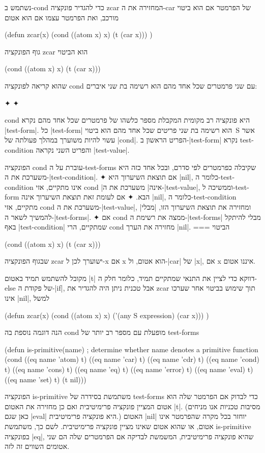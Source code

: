 נשתמש ב-cond כדי להגדיר פונקציה zcar המחזירה את ה-car של הפרמטר אם
הוא ביטוי מורכב, ואת הפרמטר עצמו אם הוא אטום
\begin{LISP}
(defun zcar(x)
  (cond ((atom x) x) (t (car x)))
)
\end{LISP}
גוף הפונקציה zcar הוא הביטוי
\begin{LISP}
  (cond ((atom x) x) (t (car x)))
\end{LISP}
שהוא קריאה לפונקציה cond עם שני פרמטרים שכל אחד מהם הוא רשימה בת שני איברים:
\begin{LTR}
  \begin{itemize}
    ✦ 
    ✦ 
  \end{itemize}
\end{LTR}
cond היא פונקציה רב מקומית המקבלת מספר כלשהו של פרמטרים שכל אחד מהם נקרא
\E|test-form|. כל \E|test-form| הוא רשימה בת שני פריטים שכל אחד מהם הוא ביטוי~S
אשר עשוי להיות משוערך במהלך פעולתה של \E|cond|. הפריט הראשון ב-\E|test-form|
נקרא test-condition והפריט השני נקראה \E|test-value|.

הפונקציה cond עוברת על ה-test-forms שקיבלה כפרמטרים לפי סדרם, ובכל אחד כזה היא
משערכת את ה-\E|test-condition|.
✦ אם תוצאת השיערוך היא \E|nil|, כלומר ה-test-condition אינו מתקיים, אזי cond
\ע|אינה| משערכת את ה-\E|test-value|, וממשיכה ל-test-form הבא.
✦ אם לעומת זאת תוצאת השיערוך אינה \E|nil|, כלומר ה-test-condition מתקיים, אזי
cond משערכת את ה-\E|test-value|, ומחזירה את תוצאת השיערוך הזו, \ע|מבלי|
להמשיך לשאר ה-\E|test-forms|.
✦ אם cond ממצה את רשימת ה-\E|test-forms| מבלי להיתקל באף \E|test-condition|
שמתקיים, הרי cond מחזירה את הערך \E|nil|.
===
הביטוי
\begin{LISP}
  (cond ((atom x) x) (t (car x)))
\end{LISP}
שבגוף הפונקציה zcar ישוערך לכן ל-x אם x הוא אטום, ול-\E|car| של \E|x|, אם x
איננו אטום.

מקובל להשתמש תמיד באטום \E|t| דווקא כדי לציין את התנאי שמתקיים תמיד, כלומר חלק
ה-else של פקודת ה-\E|if|, אבל טכנית ניתן היה להגדיר את zcar תוך שימוש בביטוי
אחר שערכו אינו \E|nil|, למשל
\begin{LISP}
(defun zcar(x)
  (cond ((atom x) x) ('(any S expression) (car x)))
)
\end{LISP}
הנה דוגמה נוספת בה cond מופעלת עם מספר רב יותר של test-forms
\begin{LISP}
(defun is-primitive(name) ; determine whether name denotes a primitive function
  (cond ((eq name 'atom) t)
        ((eq name 'car) t)
        ((eq name 'cdr) t)
        ((eq name 'cond) t)
        ((eq name 'cons) t)
        ((eq name 'eq) t)
        ((eq name 'error) t)
        ((eq name 'eval) t)
        ((eq name 'set) t)
        (t nil)))
\end{LISP}
הפונקציה is-primitive משתמשת בסידרה של test-forms כדי לבדוק אם הפרמטר שלה הוא
אטום המציין פונקציה פרימיטיבית ואם כן מחזירה את האטום \E|t|. (מסיבות טכניות אנו
מניחים כאן שגם \T|eval| היא פונקציה פרימיטיבית.) האטום \E|nil| יוחזר בכל מקרה
שהפרמטר אינו אטום, או שהוא אטום שאינו מציין פונקציה פרימיטיבית. לשם כך, משתמשת
is-primitive בפונקציה \T|eq|, שהיא פונקציה פרימיטיבית, המשמשת לבדיקה אם הפרמטרים
שלה הם שני אטומים השווים זה לזה.

